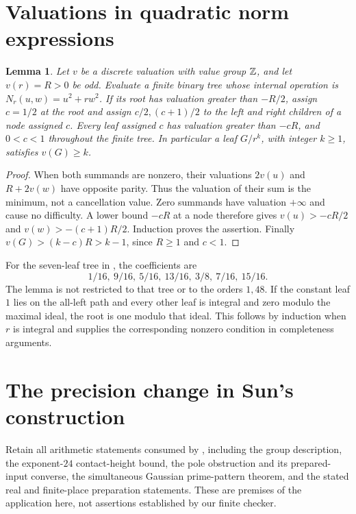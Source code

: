 \documentclass[11pt,a4paper]{article}
\newtheorem{lemma}[theorem]{Lemma}
\begin{document}
\section{Valuations in quadratic norm expressions}
\begin{lemma}\label{lem:tree}
Let $v$ be a discrete valuation with value group $\mathbb Z$, and let
$v(r)=R>0$ be odd. Evaluate a finite binary tree whose internal operation
is $N_r(u,w)=u^2+rw^2$. If its root has valuation greater than $-R/2$,
assign $c=1/2$ at the root and assign $c/2,(c+1)/2$ to the left and
right children of a node assigned $c$. Every leaf assigned $c$ has
valuation greater than $-cR$, and $0<c<1$ throughout the finite tree.
In particular a leaf $G/r^k$, with integer $k\ge1$, satisfies $v(G)\ge k$.
\end{lemma}
\begin{proof}
When both summands are nonzero, their valuations $2v(u)$ and
$R+2v(w)$ have opposite parity. Thus the valuation of their sum is
the minimum, not a cancellation value. Zero summands have valuation
$+\infty$ and cause no difficulty. A lower bound $-cR$ at a node
therefore gives $v(u)>-cR/2$ and $v(w)>-(c+1)R/2$.
Induction proves the assertion. Finally
$v(G)>(k-c)R>k-1$, since $R\ge1$ and $c<1$.
\end{proof}
For the seven-leaf tree in \cite[Section 5]{Sun}, the coefficients are
\[
       1/16,\ 9/16,\ 5/16,\ 13/16,\ 3/8,\ 7/16,\ 15/16.
\]
The lemma is not restricted to that tree or to the orders $1,48$.
If the constant leaf $1$ lies on the all-left path and every other leaf
is integral and zero modulo the maximal ideal, the root is one modulo
that ideal. This follows by induction when $r$ is integral and supplies
the corresponding nonzero condition in completeness arguments.

\section{The precision change in Sun's construction}
Retain all arithmetic statements consumed by \cite[Sections 2--6]{Sun},
including the group description, the exponent-$24$ contact-height bound,
the pole obstruction and its prepared-input converse, the simultaneous
Gaussian prime-pattern theorem, and the stated real and finite-place
preparation statements. These are premises of the application here,
not assertions established by our finite checker.
\end{document}
